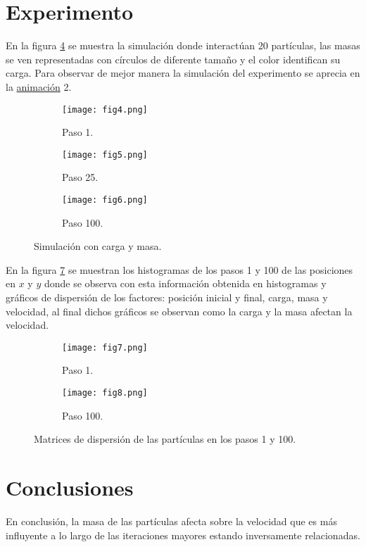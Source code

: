 \documentclass{article}
\begin{document}
\section{Experimento}
En la figura \ref{fig2} se muestra la simulación donde interactúan 20 partículas, las masas se ven representadas con círculos de diferente tamaño y el color identifican su carga. Para observar de mejor manera la simulación del experimento se aprecia en la \href{https://github.com/IsaacEstrada159/simulacion/blob/master/P09/buenos/ezgif.com-gif-maker%20(1).gif}{animación} 2.

\begin{figure} [h!]
 	\centering
 	\begin{subfigure}[b]{0.40\linewidth}
 		\texttt{[image: fig4.png]}
 		 \caption{Paso 1.}
 		\label{3d}
 	\end{subfigure}
 	\begin{subfigure}[b]{0.40\linewidth}
 		\texttt{[image: fig5.png]}
 		 \caption{Paso 25.}
 		\label{levelplot}
 	\end{subfigure}
 	 	\begin{subfigure}[b]{0.40\linewidth}
 		\texttt{[image: fig6.png]}
 		 \caption{Paso 100.}
 		\label{levelplot}
 	\end{subfigure}
 	\caption{Simulación con carga y masa.}  	
\label{fig2}
 \end{figure}

En la figura \ref{fig3} se muestran los histogramas de los pasos 1 y 100 de las posiciones en $x$ y $y$ donde se observa con esta información obtenida en histogramas y gráficos de dispersión de los factores: posición inicial y final, carga, masa y velocidad, al final dichos gráficos se observan como la carga y la masa afectan la velocidad. 

\begin{figure} [h!]
 	\centering
 	\begin{subfigure}[b]{0.40\linewidth}
 		\texttt{[image: fig7.png]}
 		 \caption{Paso 1.}
 		\label{3d}
 	\end{subfigure}
 	\begin{subfigure}[b]{0.40\linewidth}
 		\texttt{[image: fig8.png]}
 		 \caption{Paso 100.}
 		\label{levelplot}
 	\end{subfigure}
 	\caption{Matrices de dispersión de las partículas en los pasos 1 y 100.}  	
\label{fig3}
 \end{figure}
 
\section{Conclusiones} 

En conclusión, la masa de las partículas afecta sobre la velocidad que es más  influyente a lo largo de las iteraciones mayores estando inversamente relacionadas.





\end{document}
